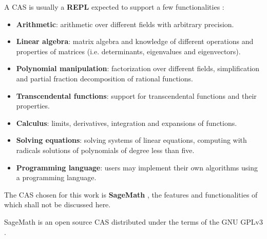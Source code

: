 A CAS is usually a \textbf{REPL} expected to support a few functionalities \cite{introcas}:
\begin{itemize}[topsep=0pt, itemsep=0pt, parsep=0pt]
    \item \textbf{Arithmetic}:
        arithmetic over different fields with arbitrary precision.
    \item \textbf{Linear algebra}:
        matrix algebra and knowledge of different operations and properties of matrices
        (i.e. determinants, eigenvalues and eigenvectors).
    \item \textbf{Polynomial manipulation}:
        factorization over different fields, simplification and partial fraction decomposition of rational functions.
    \item \textbf{Transcendental functions}:
        support for transcendental functions and their properties.
    \item \textbf{Calculus}:
        limits, derivatives, integration and expansions of functions.
    \item \textbf{Solving equations}:
        solving systems of linear equations, computing with radicals solutions of polynomials of degree less than five.
    \item \textbf{Programming language}:
        users may implement their own algorithms using a programming language.
\end{itemize}

The CAS chosen for this work is \textbf{SageMath} \cite{sage}, the features and functionalities of which shall not
be discussed here.

SageMath is an open source CAS distributed under the terms of the GNU GPLv3 \cite{gpl}.

